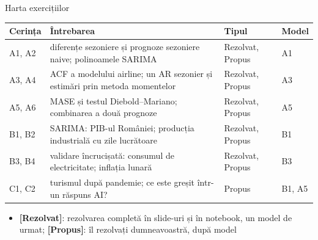\begin{frame}{Harta exercițiilor}
\itemsize{\small}
\begin{center}
\footnotesize
\begin{tabular}{>{\raggedright\arraybackslash}p{1.1cm}>{\raggedright\arraybackslash}p{7.5cm}>{\raggedright\arraybackslash}p{1.9cm}>{\raggedright\arraybackslash}p{1.4cm}}
\toprule
\textbf{Cerința} & \textbf{Întrebarea} & \textbf{Tipul} & \textbf{Model} \\
\midrule
A1, A2 & diferențe sezoniere și prognoze sezoniere naive; polinoamele SARIMA & Rezolvat, Propus & A1 \\
A3, A4 & ACF a modelului airline; un AR sezonier și estimări prin metoda momentelor & Rezolvat, Propus & A3 \\
A5, A6 & MASE și testul Diebold--Mariano; combinarea a două prognoze & Rezolvat, Propus & A5 \\
B1, B2 & SARIMA: PIB-ul României; producția industrială cu zile lucrătoare & Rezolvat, Propus & B1 \\
B3, B4 & validare încrucișată: consumul de electricitate; inflația lunară & Rezolvat, Propus & B3 \\
C1, C2 & turismul după pandemie; ce este greșit într-un răspuns AI? & Propus & B1, A5 \\
\bottomrule
\end{tabular}
\end{center}
\begin{itemize}
    \item \textbf{[Rezolvat]}: rezolvarea completă în slide-uri și în notebook, un model de urmat; \textbf{[Propus]}: îl rezolvați dumneavoastră, după model
\end{itemize}
\end{frame}

